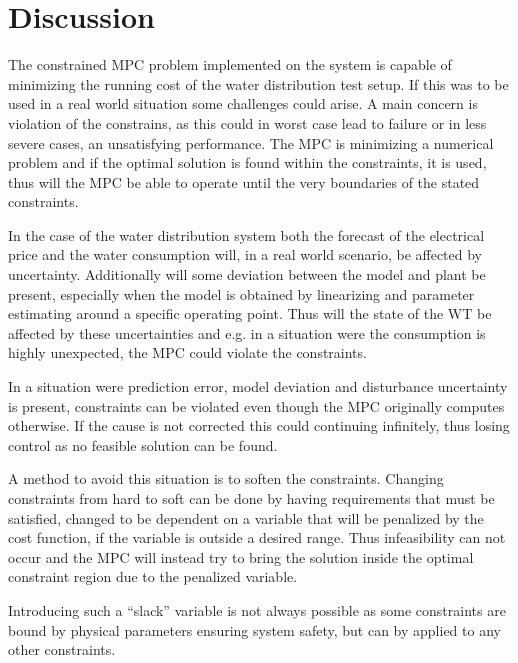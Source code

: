 \chapter{Discussion}
\label{Discussion}

The constrained MPC problem implemented on the system is capable of minimizing the running cost of the water distribution test setup. If this was to be used in a real world situation some challenges could arise. A main concern is violation of the constrains, as this could in worst case lead to failure or in less severe cases, an unsatisfying performance. 
The MPC is minimizing a numerical problem and if the optimal solution is found within the constraints, it is used, thus will the MPC be able to operate until the very boundaries of the stated constraints. 

In the case of the water distribution system both the forecast of the electrical price and the water consumption will, in a real world scenario, be affected by uncertainty. Additionally will some deviation between the model and plant be present, especially when the model is obtained by linearizing and parameter estimating around a specific operating point. Thus will the state of the WT be affected by these uncertainties and e.g. in a situation were the consumption is highly unexpected, the MPC could violate the constraints. 

In a situation were prediction error, model deviation and disturbance uncertainty is present, constraints can be violated even though the MPC originally computes otherwise. If the cause is not corrected this could continuing infinitely, thus losing control as no feasible solution can be found.    

A method to avoid this situation is to soften the constraints. Changing constraints from hard to soft can be done by having requirements that must be satisfied, changed to be dependent on a variable that will be penalized by the cost function, if the variable is outside a desired range. Thus infeasibility can not occur and the MPC will instead try to bring the solution inside the optimal constraint region due to the penalized variable.   

Introducing such a ``slack'' variable is not always possible as some constraints are bound by physical parameters ensuring system safety, but can by applied to any other constraints. 

